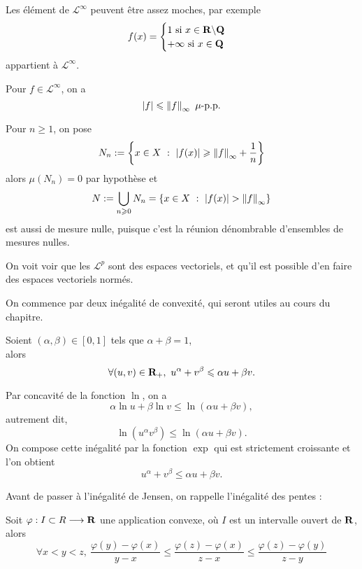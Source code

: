 \documentclass[a4paper,11pt, twoside]{article}
\begin{document}
\begin{RQ}
Les élément de $\mathcal L^\infty$ peuvent être assez moches, par exemple 
$$f(x)=\begin{cases}
  1\text{ si }x\in\mathbf R\backslash\mathbf Q\\
  +\infty\text{ si }x\in\mathbf Q
\end{cases}$$
appartient à $\mathcal L^\infty$.
\end{RQ}


\begin{RQ}
  Pour $f\in\mathcal L^\infty$, on a 
  $$\abs{f}\leqslant \norm{f}_\infty\ \mu\text{-p.p.}$$
\end{RQ}


\begin{Proof}
  Pour $n\geqslant 1$, on pose 
  $$N_n:=\ens{x\in X\ :\ \abs{f(x)}\geqslant \norm{f}_\infty+\frac1n}$$
  alors $\mu(N_n)=0$ par hypothèse et 
  $$N:=\bigcup_{n\geqslant 0}N_n=\ens{x\in X\ :\ \abs{f(x)}>\norm{f}_\infty}$$
  est aussi de mesure nulle, puisque c'est la réunion dénombrable d'ensembles de mesures nulles.
\end{Proof}


On voit voir que les $\mathcal L^p$ sont des espaces vectoriels, et qu'il est possible d'en faire des espaces vectoriels normés.

On commence par deux inégalité de convexité, qui seront utiles au cours du chapitre.




\begin{prop}
  Soient $(\alpha,\beta)\in[0,1]$ tels que $\alpha+\beta=1$,\\

  alors 
  $$\forall (u,v)\in\R_+,\ u^\alpha+v^\beta\leqslant \alpha u+\beta v.$$
\end{prop}


\begin{Proof}
  Par concavité de la fonction $\ln$, on a 
  $$\alpha\ln u+\beta\ln v\leqslant\ln\left(\alpha u+\beta v\right),$$
  autrement dit, 
  $$\ln\left(u^\alpha v^\beta\right)\leqslant\ln\left(\alpha u+\beta v\right).$$
  On compose cette inégalité par la fonction $\exp$ qui est strictement croissante et l'on obtient
  $$u^\alpha+v^\beta\leqslant \alpha u+\beta v.$$
\end{Proof}

Avant de passer à l'inégalité de Jensen, on rappelle l'inégalité des pentes : 


\begin{prop}
  Soit $\varphi:I\subset R\longrightarrow\mathbf R$ une application convexe, où $I$ est un intervalle ouvert de $\mathbf R$,\\

  alors 
  $$\forall x<y<z,\ \frac{\varphi(y)-\varphi(x)}{y-x}\leqslant\frac{\varphi(z)-\varphi(x)}{z-x}\leqslant \frac{\varphi(z)-\varphi(y)}{z-y}$$
\end{prop}
\end{document}
